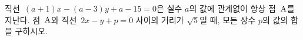 직선~$(a+1)x-(a-3)y+a-15=0$은 실수 $a$의 값에 관계없이 항상 점~$\mathrm{A}$를 지난다. 점~$\mathrm{A}$와 직선~$2x-y+p=0$ 사이의 거리가 $\sqrt{5}$일 때, 모든 상수 $p$의 값의 합을 구하시오.
